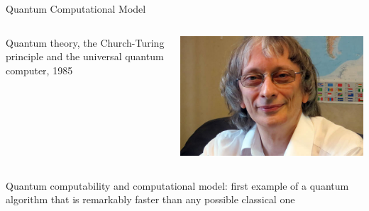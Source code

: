 \documentclass{beamer}
\begin{document}
\begin{frame}{Quantum Computational Model}

  \begin{minipage}[0.3\textheight]{\textwidth}
  \begin{columns}[c]
  \begin{column}{0.6\textwidth}
        Quantum theory, the Church-Turing principle and the universal quantum computer,
        1985
  \end{column}
  \begin{column}{0.4\textwidth}
    \includegraphics[scale=0.2]{images/deutsch.jpg}
  \end{column}
  \end{columns}
  \end{minipage}

  \vfill
  \scriptsize{
        Quantum computability and computational model: first example of a quantum
        algorithm that is remarkably faster than any possible classical one
  }

\end{frame}
\end{document}
